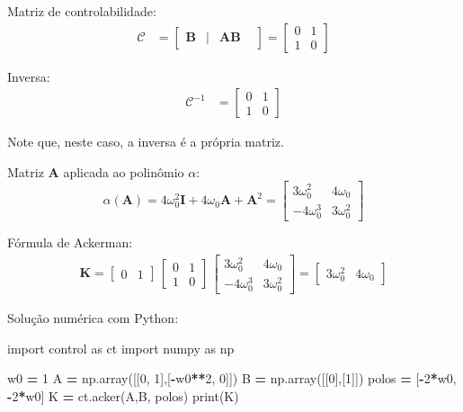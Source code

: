 \documentclass[
]{book}
\newenvironment{Shaded}{\begin{snugshade}}{\end{snugshade}}
\newcommand{\BuiltInTok}[1]{#1}
\newcommand{\DecValTok}[1]{\textcolor[rgb]{0.00,0.00,0.81}{#1}}
\newcommand{\ImportTok}[1]{#1}
\newcommand{\NormalTok}[1]{#1}
\newcommand{\OperatorTok}[1]{\textcolor[rgb]{0.81,0.36,0.00}{\textbf{#1}}}
\begin{document}
Matriz de controlabilidade:
\begin{align}
 \mathcal{{C}} &= \begin{bmatrix} \mathbf{B} & | & \mathbf{AB}& \end{bmatrix} = \left[\begin{matrix}0 & 1\\1 & 0\end{matrix}\right] 
\end{align}

Inversa:
\begin{align}
\mathcal{{C}}^{-1} &= \left[\begin{matrix}0 & 1\\1 & 0\end{matrix}\right]
\end{align}

Note que, neste caso, a inversa é a própria matriz.

Matriz \(\mathbf{A}\) aplicada ao polinômio \(\alpha\):
\[
  \alpha(\mathbf{A}) = 4\omega_0^2\mathbf{I} + 4\omega_0 \mathbf{A} + \mathbf{A}^2 = \left[\begin{matrix}3 \omega_{0}^{2} & 4 \omega_{0}\\- 4 \omega_{0}^{3} & 3 \omega_{0}^{2}\end{matrix}\right]
\]

Fórmula de Ackerman:
\begin{align}
  \mathbf{K} = \begin{bmatrix} 0 & 1 \end{bmatrix} \, \left[\begin{matrix}0 & 1\\1 & 0\end{matrix}\right] \, \left[\begin{matrix}3 \omega_{0}^{2} & 4 \omega_{0}\\- 4 \omega_{0}^{3} & 3 \omega_{0}^{2}\end{matrix}\right] = \left[\begin{matrix}3 \omega_{0}^{2} & 4 \omega_{0}\end{matrix}\right]
\end{align}

Solução numérica com Python:

\begin{Shaded}
\begin{Highlighting}[]
\ImportTok{import}\NormalTok{ control }\ImportTok{as}\NormalTok{ ct}
\ImportTok{import}\NormalTok{ numpy }\ImportTok{as}\NormalTok{ np}

\NormalTok{w0 }\OperatorTok{=} \DecValTok{1}
\NormalTok{A }\OperatorTok{=}\NormalTok{ np.array([[}\DecValTok{0}\NormalTok{, }\DecValTok{1}\NormalTok{],[}\OperatorTok{{-}}\NormalTok{w0}\OperatorTok{**}\DecValTok{2}\NormalTok{, }\DecValTok{0}\NormalTok{]])}
\NormalTok{B }\OperatorTok{=}\NormalTok{ np.array([[}\DecValTok{0}\NormalTok{],[}\DecValTok{1}\NormalTok{]])}
\NormalTok{polos }\OperatorTok{=}\NormalTok{ [}\OperatorTok{{-}}\DecValTok{2}\OperatorTok{*}\NormalTok{w0, }\OperatorTok{{-}}\DecValTok{2}\OperatorTok{*}\NormalTok{w0]}
\NormalTok{K }\OperatorTok{=}\NormalTok{ ct.acker(A,B, polos)}
\BuiltInTok{print}\NormalTok{(K)}
\end{Highlighting}
\end{Shaded}
\end{document}

